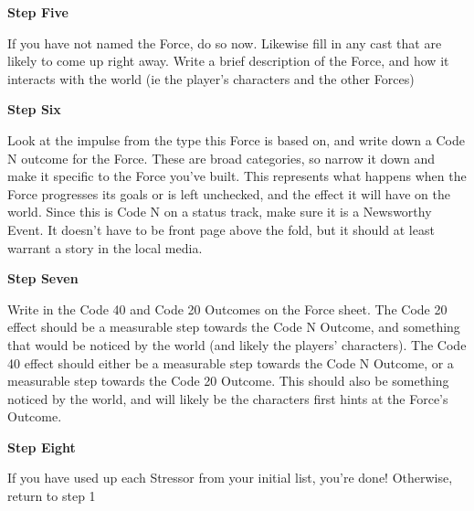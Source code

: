\documentclass[letterpaper,10pt]{article}
\newcommand{\SUBTITLE}[1]{\begin{center}{\titlefont\huge\textbf{#1}}\end{center}}
\begin{document}
\SUBTITLE{Step Five}
If you have not named the Force, do so now. Likewise fill in any cast that are likely to come up right away. Write a brief description of the Force, and how it interacts with the world (ie the player’s characters and the other Forces)

\SUBTITLE{Step Six}
Look at the impulse from the type this Force is based on, and write down a Code N outcome for the Force. These are broad categories, so narrow it down and make it specific to the Force you’ve built. This represents what happens when the Force progresses its goals or is left unchecked, and the effect it will have on the world. Since this is Code N on a status track, make sure it is a Newsworthy Event. It doesn’t have to be front page above the fold, but it should at least warrant a story in the local media.

\SUBTITLE{Step Seven}
Write in the Code 40 and Code 20 Outcomes on the Force sheet. The Code 20 effect should be a measurable step towards the Code N Outcome, and something that would be noticed by the world (and likely the players’ characters). The Code 40 effect should either be a measurable step towards the Code N Outcome, or a measurable step towards the Code 20 Outcome. This should also be something noticed by the world, and will likely be the characters first hints at the Force’s Outcome.

\SUBTITLE{Step Eight}
If you have used up each Stressor from your initial list, you’re done! Otherwise, return to step 1
\end{document}
